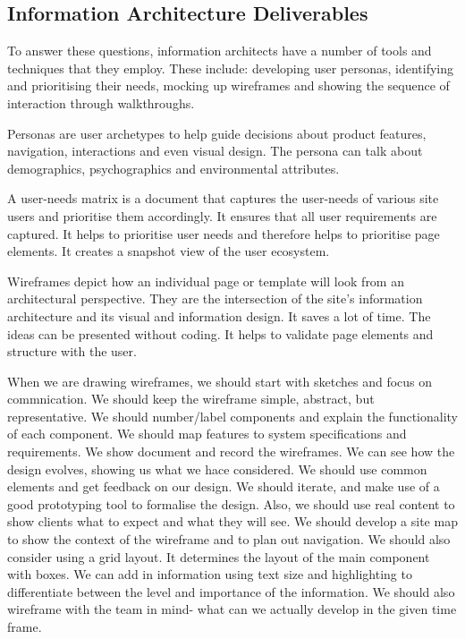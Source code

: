 \documentclass[a4paper, openany]{memoir}
\begin{document}
\subsection{Information Architecture Deliverables}
To answer these questions, information architects have a number of tools and techniques that they employ. These include: developing user personas, identifying and prioritising their needs, mocking up wireframes and showing the sequence of interaction through walkthroughs.

Personas are user archetypes to help guide decisions about product features, navigation, interactions and even visual design. The persona can talk about demographics, psychographics and environmental attributes.

A user-needs matrix is a document that captures the user-needs of various site users and prioritise them accordingly. It ensures that all user requirements are captured. It helps to prioritise user needs and therefore helps to prioritise page elements. It creates a snapshot view of the user ecosystem.

Wireframes depict how an individual page or template will look from an architectural perspective. They are the intersection of the site's information architecture and its visual and information design. It saves a lot of time. The ideas can be presented without coding. It helps to validate page elements and structure with the user.

When we are drawing wireframes, we should start with sketches and focus on commnication. We should keep the wireframe simple, abstract, but representative. We should number/label components and explain the functionality of each component. We should map features to system specifications and requirements. We show document and record the wireframes. We can see how the design evolves, showing us what we hace considered. We should use common elements and get feedback on our design. We should iterate, and make use of a good prototyping tool to formalise the design. Also, we should use real content to show clients what to expect and what they will see. We should develop a site map to show the context of the wireframe and to plan out navigation. We should also consider using a grid layout. It determines the layout of the main component with boxes. We can add in information using text size and highlighting to differentiate between the level and importance of the information. We should also wireframe with the team in mind- what can we actually develop in the given time frame.
\end{document}
